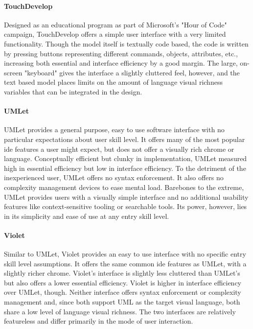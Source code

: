 \paragraph{TouchDevelop} Designed as an educational program as part of
Microsoft's "Hour of Code" campaign, TouchDevelop offers a simple user
interface with a very limited functionality. Though the model itself is
textually code based, the code is written by pressing buttons representing
different commands, objects, attributes, etc., increasing both essential
and interface efficiency by a good margin. The large, on-screen "keyboard"
gives the interface a slightly cluttered feel, however, and the text based
model places limits on the amount of language visual richness variables
that can be integrated in the design.

\paragraph{UMLet} UMLet provides a general purpose, easy to use software
interface with no particular expectations about user skill level. It offers
many of the most popular \ac{ide} features a user might expect, but does
not offer a visually rich chrome or language. Conceptually efficient but
clunky in implementation, UMLet measured high in essential efficiency but
low in interface efficiency. To the detriment of the inexperienced user,
UMLet offers no syntax enforcement. It also offers no complexity management
devices to ease mental load. Barebones to the extreme, UMLet provides users
with a visually simple interface and no additional usability features like
context-sensitive tooling or searchable tools. Its power, however, lies in
its simplicity and ease of use at any entry skill level.

\paragraph{Violet} Similar to UMLet, Violet provides an easy to use
interface with no specific entry skill level assumptions. It offers the
same common \ac{ide} features as UMLet, with a slightly richer chrome.
Violet's interface is slightly less cluttered than UMLet's but also offers
a lower essential efficiency. Violet is higher in interface efficiency over
UMLet, though. Neither interface offers syntax enforcement or complexity
management and, since both support UML as the target visual language, both
share a low level of language visual richness. The two interfaces are
relatively featureless and differ primarily in the mode of user
interaction.

